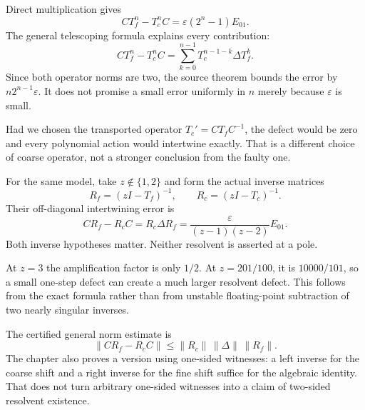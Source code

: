 
Direct multiplication gives
\[
CT_f^n-T_c^nC=\varepsilon(2^n-1)E_{01}.
\]
The general telescoping formula explains every contribution:
\[
CT_f^n-T_c^nC
=\sum_{k=0}^{n-1}T_c^{n-1-k}\Delta T_f^k.
\]
Since both operator norms are two, the source theorem bounds the error by $n2^{n-1}\varepsilon$. It does not promise a small error uniformly in $n$ merely because $\varepsilon$ is small.

Had we chosen the transported operator $T_c'=CT_fC^{-1}$, the defect would be zero and every polynomial action would intertwine exactly. That is a different choice of coarse operator, not a stronger conclusion from the faulty one.


For the same model, take $z\notin\{1,2\}$ and form the actual inverse matrices
\[
R_f=(zI-T_f)^{-1},\qquad R_c=(zI-T_c)^{-1}.
\]
Their off-diagonal intertwining error is
\[
CR_f-R_cC=R_c\Delta R_f
=\frac{\varepsilon}{(z-1)(z-2)}E_{01}.
\]
Both inverse hypotheses matter. Neither resolvent is asserted at a pole.


At $z=3$ the amplification factor is only $1/2$. At $z=201/100$, it is $10000/101$, so a small one-step defect can create a much larger resolvent defect. This follows from the exact formula rather than from unstable floating-point subtraction of two nearly singular inverses.

The certified general norm estimate is
\[
\|CR_f-R_cC\|
\le \|R_c\|\,\|\Delta\|\,\|R_f\|.
\]
The chapter also proves a version using one-sided witnesses: a left inverse for the coarse shift and a right inverse for the fine shift suffice for the algebraic identity. That does not turn arbitrary one-sided witnesses into a claim of two-sided resolvent existence.

